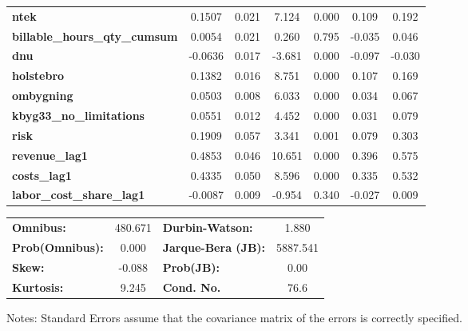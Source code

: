 \begin{center}
\begin{tabular}{lcccccc}
\textbf{ntek}                            &       0.1507  &        0.021     &     7.124  &         0.000        &        0.109    &        0.192     \\
\textbf{billable\_hours\_qty\_cumsum}    &       0.0054  &        0.021     &     0.260  &         0.795        &       -0.035    &        0.046     \\
\textbf{dnu}                             &      -0.0636  &        0.017     &    -3.681  &         0.000        &       -0.097    &       -0.030     \\
\textbf{holstebro}                       &       0.1382  &        0.016     &     8.751  &         0.000        &        0.107    &        0.169     \\
\textbf{ombygning}                       &       0.0503  &        0.008     &     6.033  &         0.000        &        0.034    &        0.067     \\
\textbf{kbyg33\_no\_limitations}         &       0.0551  &        0.012     &     4.452  &         0.000        &        0.031    &        0.079     \\
\textbf{risk}                            &       0.1909  &        0.057     &     3.341  &         0.001        &        0.079    &        0.303     \\
\textbf{revenue\_lag1}                   &       0.4853  &        0.046     &    10.651  &         0.000        &        0.396    &        0.575     \\
\textbf{costs\_lag1}                     &       0.4335  &        0.050     &     8.596  &         0.000        &        0.335    &        0.532     \\
\textbf{labor\_cost\_share\_lag1}        &      -0.0087  &        0.009     &    -0.954  &         0.340        &       -0.027    &        0.009     \\
\bottomrule
\end{tabular}
\begin{tabular}{lclc}
\textbf{Omnibus:}       & 480.671 & \textbf{  Durbin-Watson:     } &    1.880  \\
\textbf{Prob(Omnibus):} &   0.000 & \textbf{  Jarque-Bera (JB):  } & 5887.541  \\
\textbf{Skew:}          &  -0.088 & \textbf{  Prob(JB):          } &     0.00  \\
\textbf{Kurtosis:}      &   9.245 & \textbf{  Cond. No.          } &     76.6  \\
\bottomrule
\end{tabular}
\end{center}

Notes: \newline
 [1] Standard Errors assume that the covariance matrix of the errors is correctly specified.